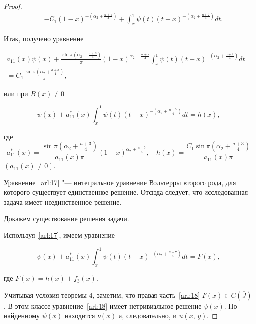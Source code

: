 \begin{proof}
\begin{multline*}
=-C_1(1-x)^{-\left(\alpha_2+\frac{a+7}{4}\right)}

+\int_{x}^{1}\psi(t)(t-x)^{-\left(\alpha_2+\frac{a+7}{4}\right)}dt.

\end{multline*}



Итак, получено уравнение

\begin{multline*}

a_{11}(x)\psi(x)+\frac{\sin\pi\left(\alpha_2+\frac{a+3}{4}\right)}{\pi}(1-x)^{\alpha_2+\frac{a+7}{4}}\int_{x}^{1}\psi(t)(t-x)^{-\left(\alpha_2+\frac{a+7}{4}\right)}dt=

\\=C_1\frac{\sin\pi\left(\alpha_2+\frac{a+3}{4}\right)}{\pi},

\end{multline*}

или при $B(x)\neq 0$

\begin{equation}

\psi(x)+a_{11}^*(x)\int_{x}^{1}\psi(t)(t-x)^{-\left(\alpha_2+\frac{a+7}{4}\right)}dt=h(x),

\label{arl:17}

\end{equation}

где $$a_{11}^*(x)=\frac{\sin\pi\left(\alpha_2+\frac{a+3}{4}\right)}{a_{11}(x)\pi}(1-x)^{\alpha_2+\frac{a+7}{4}},\quad  h(x)=\frac{C_1\sin\pi\left(\alpha_2+\frac{a+3}{4}\right)}{a_{11}(x)\pi}$$ $(a_{11}(x)\neq 0).$



Уравнение~\eqref{arl:17} "--- интегральное уравнение Вольтерры второго рода, для которого существует единственное решение. Отсюда следует, что исследованная задача имеет неединственное решение.



Докажем существование решения задачи.

Используя~\eqref{arl:17}, имеем уравнение

\begin{equation}

\psi(x)+a_{11}^*(x)\int_{x}^{1}\psi(t)(t-x)^{-\left(\alpha_2+\frac{a+7}{4}\right)}dt=F(x),

\label{arl:18}

\end{equation}

где $F(x)=h(x)+f_3(x)$.



Учитывая условия теоремы 4, заметим, что правая часть~\eqref{arl:18}  \mbox{$F(x)\in C(\overline{J})$}. В этом классе уравнение~\eqref{arl:18} имеет нетривиальное решение $\psi(x)$. По найденному $\psi(x)$ находится $\nu(x)$ а, следовательно, и $u(x,\,y)$.

\end{proof}



